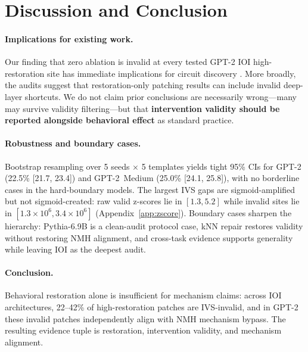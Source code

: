 \documentclass{article}
\begin{document}
\section{Discussion and Conclusion}
\label{sec:discussion}

\paragraph{Implications for existing work.}
Our finding that zero ablation is invalid at every tested GPT-2 IOI high-restoration site has immediate implications for circuit discovery \citep{conmy2023automated}. More broadly, the audits suggest that restoration-only patching results can include invalid deep-layer shortcuts. We do not claim prior conclusions are necessarily wrong---many may survive validity filtering---but that \textbf{intervention validity should be reported alongside behavioral effect} as standard practice.

\paragraph{Robustness and boundary cases.}
Bootstrap resampling over 5 seeds $\times$ 5 templates yields tight 95\% CIs for GPT-2 (22.5\% [21.7, 23.4]) and GPT-2~Medium (25.0\% [24.1, 25.8]), with no borderline cases in the hard-boundary models. The largest IVS gaps are sigmoid-amplified but not sigmoid-created: raw valid z-scores lie in $[1.3, 5.2]$ while invalid sites lie in $[1.3{\times}10^6, 3.4{\times}10^6]$ (Appendix~\ref{app:zscore}). Boundary cases sharpen the hierarchy: Pythia-6.9B is a clean-audit protocol case, kNN repair restores validity without restoring NMH alignment, and cross-task evidence supports generality while leaving IOI as the deepest audit.

\paragraph{Conclusion.}
Behavioral restoration alone is insufficient for mechanism claims: across IOI architectures, 22--42\% of high-restoration patches are IVS-invalid, and in GPT-2 these invalid patches independently align with NMH mechanism bypass. The resulting evidence tuple is restoration, intervention validity, and mechanism alignment.

\clearpage


\end{document}
